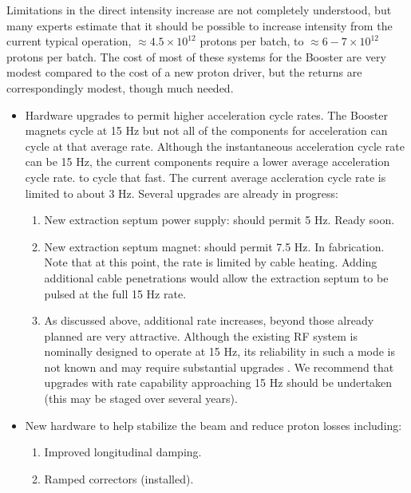 \documentclass{article}
\begin{document}
Limitations in the direct intensity increase are not completely understood,
but many experts estimate that it should be possible to increase intensity
from the current typical operation, $\approx 4.5\times10^{12}$ protons
per batch, to $\approx 6-7\times10^{12}$ protons per batch. The cost of
most of these systems for the Booster are very modest compared to the
cost of a new proton driver, but the returns are correspondingly modest,
though much needed.
   \begin {itemize}
   \item Hardware upgrades to permit higher acceleration cycle rates. 
         The Booster magnets cycle at 15 Hz but not all of the components
         for acceleration can cycle at that average rate. Although the 
         instantaneous acceleration cycle rate can be 15 Hz, the current 
         components require a lower average acceleration cycle rate.
         to cycle that fast. The current average accleration cycle rate 
         is limited to about 3 Hz.
         Several upgrades are already in progress:
         \begin {enumerate}
         \item New extraction septum power supply: should permit 5 Hz. 
               Ready soon.
         \item New extraction septum magnet: should permit 7.5 Hz. In
               fabrication.  Note that at this point, the rate is limited
               by cable heating.  Adding additional cable penetrations would
               allow the extraction septum to be pulsed at the full
               15 Hz rate.
         \item As discussed above, additional rate increases, beyond those
               already planned are very attractive. Although the existing
               RF system is nominally designed to operate at 15 Hz, its
               reliability in such a mode is not known and may require
               substantial upgrades \cite {Webber2}. We recommend that 
               upgrades with rate capability approaching 15 Hz should be
               undertaken (this may be staged over several years).
         \end {enumerate}
   \item New hardware to help stabilize the beam and reduce proton
         losses including:
         \begin {enumerate}
         \item Improved longitudinal damping.
         \item Ramped correctors (installed).

\end{enumerate}
\end{itemize}
\end{document}
